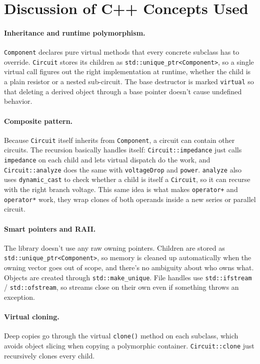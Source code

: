 \documentclass[11pt]{article}
\begin{document}
\section{Discussion of C++ Concepts Used}

\paragraph{Inheritance and runtime polymorphism.}
\texttt{Component} declares pure virtual methods that every concrete subclass
has to override. \texttt{Circuit} stores its children as
\texttt{std::unique\_ptr<Component>}, so a single virtual call figures out
the right implementation at runtime, whether the child is a plain
resistor or a nested sub-circuit. The base destructor is marked
\texttt{virtual} so that deleting a derived object through a base pointer
doesn't cause undefined behavior.

\paragraph{Composite pattern.}
Because \texttt{Circuit} itself inherits from \texttt{Component}, a
circuit can contain other circuits. The recursion basically handles itself:
\texttt{Circuit::impedance} just calls \texttt{impedance} on each child
and lets virtual dispatch do the work, and \texttt{Circuit::analyze} does
the same with \texttt{voltageDrop} and \texttt{power}.
\texttt{analyze} also uses \texttt{dynamic\_cast} to check whether a
child is itself a \texttt{Circuit}, so it can recurse with the right
branch voltage. This same idea is what makes \texttt{operator+} and
\texttt{operator*} work, they wrap clones of both operands inside a
new series or parallel circuit.

\paragraph{Smart pointers and RAII.}
The library doesn't use any raw owning pointers. Children are stored as
\texttt{std::unique\_ptr<Component>}, so memory is cleaned up automatically
when the owning vector goes out of scope, and there's no ambiguity about
who owns what. Objects are created through \texttt{std::make\_unique}. File
handles use \texttt{std::ifstream} / \texttt{std::ofstream}, so streams
close on their own even if something throws an exception.

\paragraph{Virtual cloning.}
Deep copies go through the virtual \texttt{clone()} method on each
subclass, which avoids object slicing when copying a polymorphic
container. \texttt{Circuit::clone} just recursively clones every child.
\end{document}
